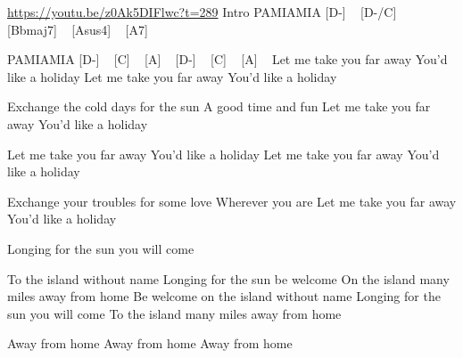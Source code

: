 \url{https://youtu.be/z0Ak5DIFlwc?t=289}
Intro
PAMIAMIA
[D-] ~ [D-/C] ~ [Bbmaj7] ~ [Asus4] ~ [A7] ~

PAMIAMIA
[D-] ~ [C] ~ [A] ~ [D-] ~ [C] ~ [A] ~
Let me take you far away
You'd like a holiday
Let me take you far away
You'd like a holiday

Exchange the cold days for the sun
A good time and fun
Let me take you far away
You'd like a holiday

Let me take you far away
You'd like a holiday
Let me take you far away
You'd like a holiday

Exchange your troubles for some love
Wherever you are
Let me take you far away
You'd like a holiday

Longing for the sun you will come

To the island without name
Longing for the sun be welcome
On the island many miles away from home
Be welcome on the island without name
Longing for the sun you will come
To the island many miles away from home

Away from home
Away from home
Away from home
